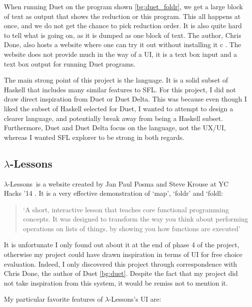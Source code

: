 \noindent When running Duet \cite{duet_hackage} on the program shown \ref{bg:duet_foldr}, we get a large block of text as output that shows the reduction or this program. This all happens at once, and we do not get the chance to pick reduction order. It is also quite hard to tell what is going on, as it is dumped as one block of text. The author, Chris Done, also hosts a website where one can try it out without installing it c \cite{duet_delta}. The website does not provide much in the way of a UI, it is a text box input and a text box output for running Duet programs.

The main strong point of this project is the language. It is a solid subset of Haskell that includes many similar features to SFL. For this project, I did not draw direct inspiration from Duet or Duet Delta. This was because even though I liked the subset of Haskell selected for Duet, I wanted to attempt to design a clearer language, and potentially break away from being a Haskell subset. Furthermore, Duet and Duet Delta focus on the language, not the UX/UI, whereas I wanted SFL explorer to be strong in both regards. 

\subsection{$\lambda$-Lessons}
\newcommand{\llessons}{$\lambda$-Lessons}
\label{bg:llessons}

\llessons\ is a website created by Jan Paul Posma and Steve Krouse at YC Hacks '14 \cite{lambdalessons}. It is a very effective demonstration of `map', `foldr' and `foldl:

\begin{quotation}
`A short, interactive lesson that teaches core functional programming concepts. It was designed to transform the way you think about performing operations on lists of things, by showing you how functions are executed' \cite{lambdalessons}
\end{quotation}

\noindent It is unfortunate I only found out about it at the end of phase 4 of the project, otherwise my project could have drawn inspiration in terms of UI for free choice evaluation. Indeed, I only discovered this project through correspondence with Chris Done, the author of Duet \ref{bg:duet}. Despite the fact that my project did not take inspiration from this system, it would be remiss not to mention it. 

My particular favorite features of \llessons's UI are:

